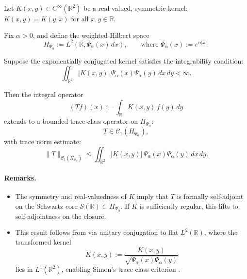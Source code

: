 \begin{lemma}
\label{lem:trace_class_conjugated_kernel}
Let \( K(x, y) \in C^\infty(\mathbb{R}^2) \) be a real-valued, symmetric kernel: \( K(x,y) = K(y,x) \) for all \( x,y \in \mathbb{R} \).

Fix \( \alpha > 0 \), and define the weighted Hilbert space
\[
H_{\Psi_\alpha} := L^2(\mathbb{R}, \Psi_\alpha(x)\, dx), \qquad \text{where } \Psi_\alpha(x) := e^{\alpha |x|}.
\]

Suppose the exponentially conjugated kernel satisfies the integrability condition:
\[
\iint_{\mathbb{R}^2} |K(x, y)| \, \Psi_\alpha(x) \Psi_\alpha(y) \, dx\, dy < \infty.
\]

Then the integral operator
\[
(T f)(x) := \int_{\mathbb{R}} K(x, y)\, f(y)\, dy
\]
extends to a bounded trace-class operator on \( H_{\Psi_\alpha} \):
\[
T \in \mathcal{C}_1(H_{\Psi_\alpha}),
\]
with trace norm estimate:
\[
\| T \|_{\mathcal{C}_1(H_{\Psi_\alpha})}
\le \iint_{\mathbb{R}^2} |K(x, y)|\, \Psi_\alpha(x)\Psi_\alpha(y)\, dx\, dy.
\]

\paragraph{Remarks.}
\begin{itemize}
    \item The symmetry and real-valuedness of \( K \) imply that \( T \) is formally self-adjoint on the Schwartz core \( \mathcal{S}(\mathbb{R}) \subset H_{\Psi_\alpha} \). If \( K \) is sufficiently regular, this lifts to self-adjointness on the closure.

    \item This result follows from  via unitary conjugation to flat \( L^2(\mathbb{R}) \), where the transformed kernel
    \[
    \widetilde{K}(x,y) := \frac{K(x,y)}{\sqrt{\Psi_\alpha(x)\Psi_\alpha(y)}}
    \]
    lies in \( L^1(\mathbb{R}^2) \), enabling Simon's trace-class criterion \cite[Thm.~4.2]{Simon2005TraceIdeals}.
\end{itemize}
\end{lemma}
